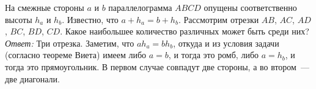 \problem
На смежные стороны $a$ и $b$ параллелограмма $ABCD$ опущены соответственно
высоты $h_a$ и $h_b$.
Известно, что $a + h_a = b + h_b$.
Рассмотрим отрезки $AB$, $AC$, $AD$, $BC$, $BD$, $CD$.
Какое наибольшее количество различных может быть среди них?
\solution
\label{solution:2011/regatta/junior/geomt/4}%
\emph{Ответ:} Три отрезка.
Заметим, что $a h_a = b h_b$, откуда и из условия задачи
(согласно теореме Виета) имеем либо $a = b$, и тогда это ромб, либо $a = h_b$,
и тогда это прямоугольник.
В первом случае совпадут две стороны, а во втором~--- две диагонали.
\endproblem
